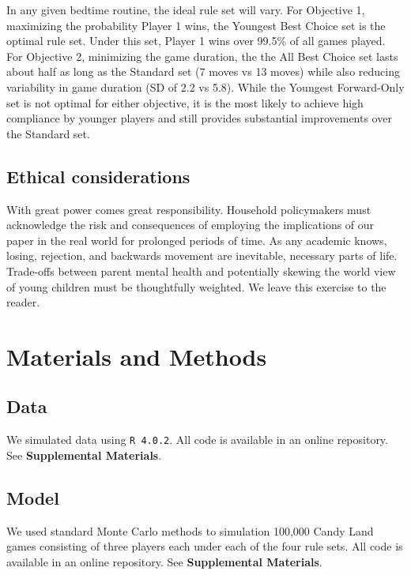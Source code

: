 \documentclass[letterpaper,9pt,twocolumn,twoside,]{pinp}
\begin{document}
In any given bedtime routine, the ideal rule set will vary. For
Objective 1, maximizing the probability Player 1 wins, the Youngest Best
Choice set is the optimal rule set. Under this set, Player 1 wins over
99.5\% of all games played. For Objective 2, minimizing the game
duration, the the All Best Choice set lasts about half as long as the
Standard set (7 moves vs 13 moves) while also reducing variability in
game duration (SD of 2.2 vs 5.8). While the Youngest Forward-Only set is
not optimal for either objective, it is the most likely to achieve high
compliance by younger players and still provides substantial
improvements over the Standard set.

\hypertarget{ethical-considerations}{%
\subsection{Ethical considerations}\label{ethical-considerations}}

With great power comes great responsibility. Household policymakers must
acknowledge the risk and consequences of employing the implications of
our paper in the real world for prolonged periods of time. As any
academic knows, losing, rejection, and backwards movement are
inevitable, necessary parts of life. Trade-offs between parent mental
health and potentially skewing the world view of young children must be
thoughtfully weighted. We leave this exercise to the reader.

\hypertarget{materials-and-methods}{%
\section{Materials and Methods}\label{materials-and-methods}}

\hypertarget{data}{%
\subsection{Data}\label{data}}

We simulated data using \texttt{R\ 4.0.2}. All code is available in an
online repository. See \textbf{Supplemental Materials}.

\hypertarget{model}{%
\subsection{Model}\label{model}}

We used standard Monte Carlo methods to simulation 100,000 Candy Land
games consisting of three players each under each of the four rule sets.
All code is available in an online repository. See \textbf{Supplemental
Materials}.
\end{document}
